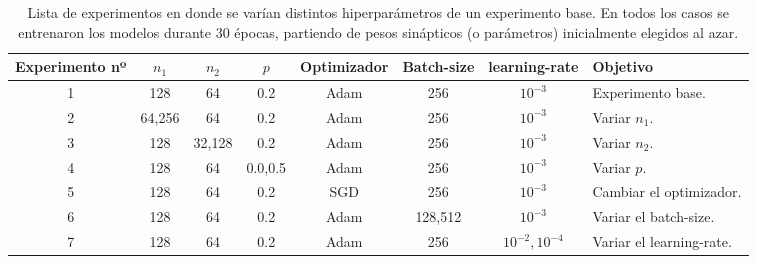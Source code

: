 \documentclass[aps,prl,twocolumn,groupedaddress]{revtex4-2}
\begin{document}
\begin{table}%
\begin{ruledtabular}
\begin{tabular}{cccccccl} %
Experimento nº & $n_1$ & $n_2$ & $p$ & Optimizador & Batch-size & learning-rate & Objetivo\\ %
\hline
1 & 128 & 64 & 0.2 & Adam & 256 & $10^{-3}$ & Experimento base. \\
2 & 64,256 & 64 & 0.2 & Adam & 256 & $10^{-3}$ & Variar $n_1$. \\
3 & 128 & 32,128 & 0.2 & Adam & 256 & $10^{-3}$ & Variar $n_2$. \\
4 & 128 & 64 & 0.0,0.5 & Adam & 256 & $10^{-3}$ & Variar $p$. \\
5 & 128 & 64 & 0.2 & SGD & 256 & $10^{-3}$ & Cambiar el optimizador. \\
6 & 128 & 64 & 0.2 & Adam & 128,512 & $10^{-3}$ & Variar el batch-size. \\
7 & 128 & 64 & 0.2 & Adam & 256 & $10^{-2},10^{-4}$ & Variar el learning-rate. \\
\end{tabular}
\end{ruledtabular}
\caption{
\label{tab1}
Lista de experimentos en donde se varían distintos hiperparámetros de un experimento base.
En todos los casos se entrenaron los modelos durante 30 épocas, partiendo de pesos sinápticos (o parámetros) inicialmente elegidos al azar.
}
\end{table}
\end{document}
